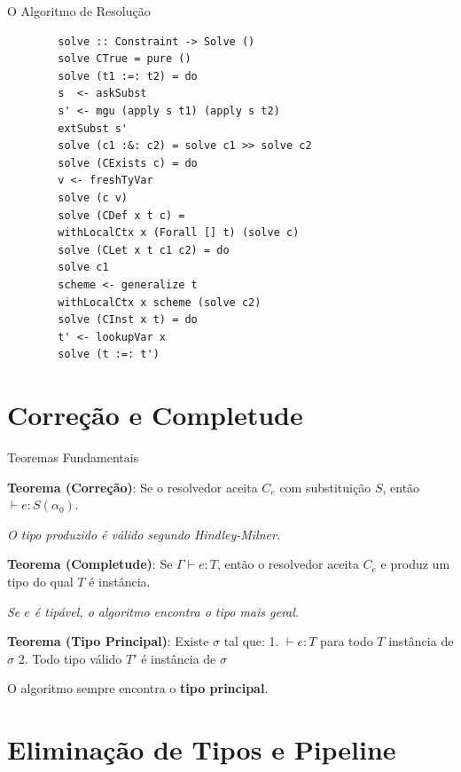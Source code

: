 \begin{frame}[fragile]{O Algoritmo de Resolução}

    \begin{lstlisting}
        solve :: Constraint -> Solve ()
        solve CTrue = pure ()
        solve (t1 :=: t2) = do
        s  <- askSubst
        s' <- mgu (apply s t1) (apply s t2)
        extSubst s'
        solve (c1 :&: c2) = solve c1 >> solve c2
        solve (CExists c) = do
        v <- freshTyVar
        solve (c v)
        solve (CDef x t c) =
        withLocalCtx x (Forall [] t) (solve c)
        solve (CLet x t c1 c2) = do
        solve c1
        scheme <- generalize t
        withLocalCtx x scheme (solve c2)
        solve (CInst x t) = do
        t' <- lookupVar x
        solve (t :=: t')
    \end{lstlisting}
\end{frame}


\section{Correção e Completude}\label{correuxe7uxe3o-e-completude}

\begin{frame}{Teoremas Fundamentais}

    \textbf{Teorema (Correção)}: Se o resolvedor aceita \(C_e\) com
    substituição \(S\), então \(\vdash e : S(\alpha_0)\).

    \emph{O tipo produzido é válido segundo Hindley-Milner.}

    \textbf{Teorema (Completude)}: Se \(\Gamma \vdash e : T\), então o
    resolvedor aceita \(C_e\) e produz um tipo do qual \(T\) é instância.

    \emph{Se \(e\) é tipável, o algoritmo encontra o tipo mais geral.}

    \textbf{Teorema (Tipo Principal)}: Existe \(\sigma\) tal que: 1.
    \(\vdash e : T\) para todo \(T\) instância de \(\sigma\) 2. Todo tipo
    válido \(T'\) é instância de \(\sigma\)

    O algoritmo sempre encontra o \textbf{tipo principal}.
\end{frame}


\section{Eliminação de Tipos e
Pipeline}\label{eliminauxe7uxe3o-de-tipos-e-pipeline}


